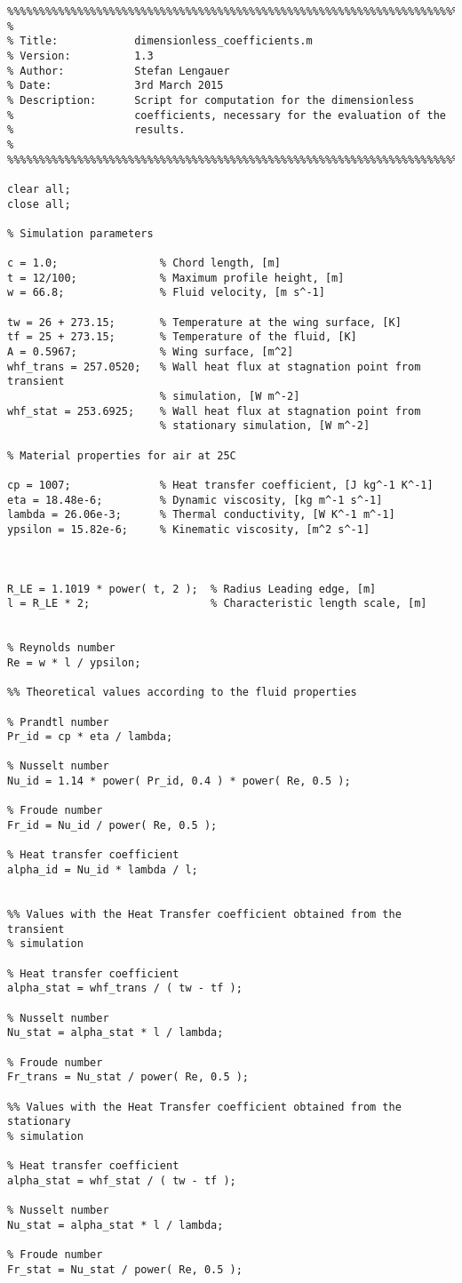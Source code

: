 \newpage
\begin{lstlisting}
%%%%%%%%%%%%%%%%%%%%%%%%%%%%%%%%%%%%%%%%%%%%%%%%%%%%%%%%%%%%%%%%%%%%%%%%%%%
%
% Title:            dimensionless_coefficients.m
% Version:          1.3
% Author:           Stefan Lengauer
% Date:             3rd March 2015
% Description:      Script for computation for the dimensionless
%                   coefficients, necessary for the evaluation of the 
%                   results.
%
%%%%%%%%%%%%%%%%%%%%%%%%%%%%%%%%%%%%%%%%%%%%%%%%%%%%%%%%%%%%%%%%%%%%%%%%%%%

clear all;
close all;

% Simulation parameters

c = 1.0;                % Chord length, [m]
t = 12/100;             % Maximum profile height, [m]
w = 66.8;               % Fluid velocity, [m s^-1]  

tw = 26 + 273.15;       % Temperature at the wing surface, [K]
tf = 25 + 273.15;       % Temperature of the fluid, [K]
A = 0.5967;             % Wing surface, [m^2]
whf_trans = 257.0520;   % Wall heat flux at stagnation point from transient
                        % simulation, [W m^-2]
whf_stat = 253.6925;    % Wall heat flux at stagnation point from
                        % stationary simulation, [W m^-2]

% Material properties for air at 25C

cp = 1007;              % Heat transfer coefficient, [J kg^-1 K^-1]
eta = 18.48e-6;         % Dynamic viscosity, [kg m^-1 s^-1]
lambda = 26.06e-3;      % Thermal conductivity, [W K^-1 m^-1] 
ypsilon = 15.82e-6;     % Kinematic viscosity, [m^2 s^-1]



R_LE = 1.1019 * power( t, 2 );  % Radius Leading edge, [m]
l = R_LE * 2;                   % Characteristic length scale, [m]


% Reynolds number
Re = w * l / ypsilon;

%% Theoretical values according to the fluid properties

% Prandtl number
Pr_id = cp * eta / lambda;

% Nusselt number
Nu_id = 1.14 * power( Pr_id, 0.4 ) * power( Re, 0.5 );

% Froude number
Fr_id = Nu_id / power( Re, 0.5 );

% Heat transfer coefficient
alpha_id = Nu_id * lambda / l;


%% Values with the Heat Transfer coefficient obtained from the transient
% simulation

% Heat transfer coefficient
alpha_stat = whf_trans / ( tw - tf );

% Nusselt number
Nu_stat = alpha_stat * l / lambda;

% Froude number
Fr_trans = Nu_stat / power( Re, 0.5 );

%% Values with the Heat Transfer coefficient obtained from the stationary
% simulation

% Heat transfer coefficient
alpha_stat = whf_stat / ( tw - tf );

% Nusselt number
Nu_stat = alpha_stat * l / lambda;

% Froude number
Fr_stat = Nu_stat / power( Re, 0.5 );
\end{lstlisting}
